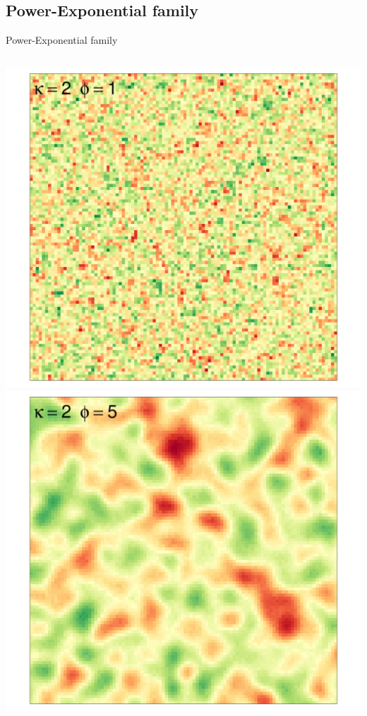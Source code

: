 \documentclass[
  ignorenonframetext,
]{beamer}
\begin{document}
\hypertarget{power-exponential-family-3}{%
\subsection{Power-Exponential family}\label{power-exponential-family-3}}

\begin{frame}{Power-Exponential family}
\small

\begin{columns}[T]
\begin{column}{0.33\textwidth}
\includegraphics{Lecture_1_files/figure-beamer/unnamed-chunk-18-1.pdf}
\includegraphics{Lecture_1_files/figure-beamer/unnamed-chunk-19-1.pdf}
\end{column}


\end{columns}
\end{frame}
\end{document}
